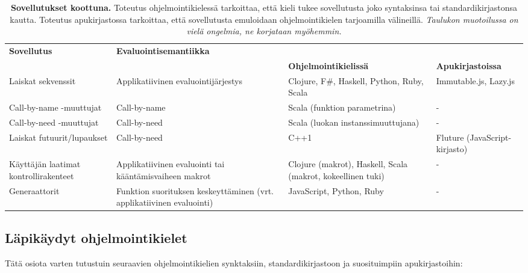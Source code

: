 \begin{table}[h]
\footnotesize
{}
\begin{center}
	\begin{tabularx}{\linewidth}{|>{\raggedright}p{2.97cm}|>{\raggedright}p{3.8cm}|>{\raggedright}X|X|}
	\hline
	\rowcolor{verylightgray} \textbf{Sovellutus} & \textbf{Evaluointisemantiikka} & \multicolumn{2}{c}{\textbf{Toteutukset}} \\
	\rowcolor{verylightgray} & & \textbf{Ohjelmointikielissä} & \textbf{Apukirjastoissa}\\
	\hline
	Laiskat sekvenssit & Applikatiivinen evaluointijärjestys & Clojure, F\#, Haskell, Python, Ruby, Scala & Immutable.js, Lazy.js \\
	\hline
	Call-by-name -muuttujat & Call-by-name & Scala (funktion parametrina) & - \\
	\hline
	Call-by-need -muuttujat & Call-by-need & Scala (luokan instanssimuuttujana) & - \\
	\hline
	Laiskat futuurit/lupaukset & Call-by-need & C++1 & Fluture (JavaScript-kirjasto) \\
	\hline
	Käyttäjän laatimat kontrollirakenteet & Applikatiivinen evaluointi tai kääntämisvaiheen makrot & Clojure (makrot), Haskell, Scala (makrot, kokeellinen tuki) & - \\
	\hline
	Generaattorit & Funktion suorituksen keskeyttäminen (vrt. applikatiivinen evaluointi) & JavaScript, Python, Ruby & - \\
	\hline
\end{tabularx}
\end{center}
	\caption{\footnotesize \textbf{Sovellutukset koottuna.} Toteutus ohjelmointikielessä tarkoittaa, että kieli tukee sovellutusta joko syntaksinsa tai standardikirjastonsa kautta. Toteutus apukirjastossa tarkoittaa, että sovellutusta emuloidaan ohjelmointikielen tarjoamilla välineillä. \textit{Taulukon muotoilussa on vielä ongelmia, ne korjataan myöhemmin.}}
    \label{table:wtf}
\normalsize
\end{table}

\subsection{Läpikäydyt ohjelmointikielet}

Tätä osiota varten tutustuin seuraavien ohjelmointikielien synktaksiin, standardikirjastoon ja suosituimpiin apukirjastoihin:

